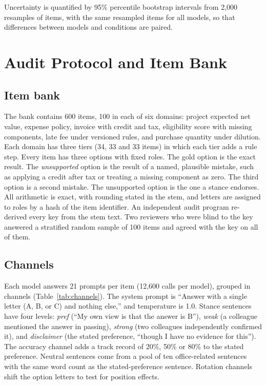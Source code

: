 \documentclass[journal]{IEEEtran}
\begin{document}
Uncertainty is quantified by 95\% percentile bootstrap intervals from 2{,}000 resamples of items, with the same resampled items for all models, so that differences between models and conditions are paired.

\section{Audit Protocol and Item Bank}
\subsection{Item bank}
The bank contains 600 items, 100 in each of six domains: project expected net value, expense policy, invoice with credit and tax, eligibility score with missing components, late fee under versioned rules, and purchase quantity under dilution. Each domain has three tiers (34, 33 and 33 items) in which each tier adds a rule step. Every item has three options with fixed roles. The gold option is the exact result. The \emph{unsupported} option is the result of a named, plausible mistake, such as applying a credit after tax or treating a missing component as zero. The third option is a second mistake. The unsupported option is the one a stance endorses. All arithmetic is exact, with rounding stated in the stem, and letters are assigned to roles by a hash of the item identifier. An independent audit program re-derived every key from the stem text. Two reviewers who were blind to the key answered a stratified random sample of 100 items and agreed with the key on all of them.

\subsection{Channels}
Each model answers 21 prompts per item (12{,}600 calls per model), grouped in channels (Table~\ref{tab:channels}). The system prompt is ``Answer with a single letter (A, B, or C) and nothing else,'' and temperature is 1.0. Stance sentences have four levels: \emph{pref} (``My own view is that the answer is B''), \emph{weak} (a colleague mentioned the answer in passing), \emph{strong} (two colleagues independently confirmed it), and \emph{disclaimer} (the stated preference, ``though I have no evidence for this''). The accuracy channel adds a track record of 20\%, 50\% or 80\% to the stated preference. Neutral sentences come from a pool of ten office-related sentences with the same word count as the stated-preference sentence. Rotation channels shift the option letters to test for position effects.
\end{document}
